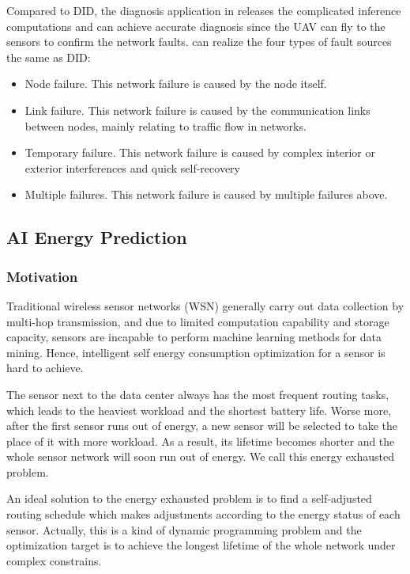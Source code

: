 Compared to DID, the diagnosis application in {\sdn} releases the complicated inference
computations and can achieve accurate diagnosis since the UAV can fly to the sensors 
to confirm the network faults. {\sdn} can realize the four types of fault sources the same as DID:  
\begin{itemize}
\item	Node failure. This network failure is caused by the node itself.
\item	Link failure. This network failure is caused by the communication links 
between nodes, mainly relating to traffic flow in networks.
\item	Temporary failure. This  network failure is caused by complex interior or exterior 
interferences and quick self-recovery
\item	Multiple failures. This  network failure is caused by multiple failures above.
\end{itemize}

\subsection{AI Energy Prediction}

\subsubsection{Motivation}
Traditional wireless sensor networks (WSN)  generally carry out data 
collection by multi-hop transmission,
and due to limited computation capability and storage capacity, sensors are incapable
to perform machine learning methods for data mining. 
Hence, intelligent self energy consumption optimization for a sensor is hard to achieve.

The sensor next to the data center always has the most frequent routing tasks, which leads to
the heaviest workload and the shortest battery life. Worse more, after the
first sensor runs out of energy, a new sensor will be selected to take the place 
of it with more workload. As a result, its lifetime becomes shorter and the whole 
sensor network will soon run out of energy. We call this energy exhausted problem.

An ideal solution to the energy exhausted problem is to find a self-adjusted routing schedule which 
makes adjustments according to the energy status of each sensor. 
Actually, this is a kind of dynamic programming problem and
the optimization target is to achieve the longest lifetime of the whole network under
complex constrains. 

